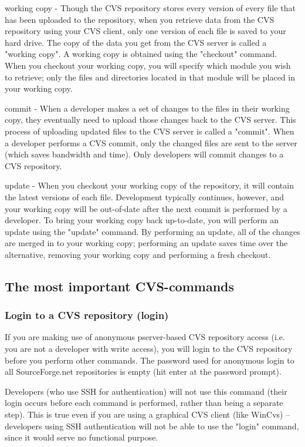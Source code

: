 working copy - Though the CVS repository stores every version of every file that has been uploaded to the repository, when you retrieve data from the CVS repository using your CVS client, only one version of each file is saved to your hard drive. The copy of the data you get from the CVS server is called a "working copy". A working copy is obtained using the "checkout" command. When you checkout your working copy, you will specify which module you wish to retrieve; only the files and directories located in that module will be placed in your working copy.

commit - When a developer makes a set of changes to the files in their working copy, they eventually need to upload those changes back to the CVS server. This process of uploading updated files to the CVS server is called a "commit". When a developer performs a CVS commit, only the changed files are sent to the server (which saves bandwidth and time). Only developers will commit changes to a CVS repository.

update - When you checkout your working copy of the repository, it will contain the latest versions of each file. Development typically continues, however, and your working copy will be out-of-date after the next commit is performed by a developer. To bring your working copy back up-to-date, you will perform an update using the "update" command. By performing an update, all of the changes are merged in to your working copy; performing an update saves time over the alternative, removing your working copy and performing a fresh checkout.

\subsection{The most important CVS-commands}

\subsubsection{Login to a CVS repository (login)}

If you are making use of anonymous pserver-based CVS repository access (i.e. you are not a developer with write access), you will login to the CVS repository before you perform other commands. The password used for anonymous login to all SourceForge.net repositories is empty (hit enter at the password prompt).

Developers (who use SSH for authentication) will not use this command (their login occurs before each command is performed, rather than being a separate step). This is true even if you are using a graphical CVS client (like WinCvs) -- developers using SSH authentication will not be able to use the "login" command, since it would serve no functional purpose.

